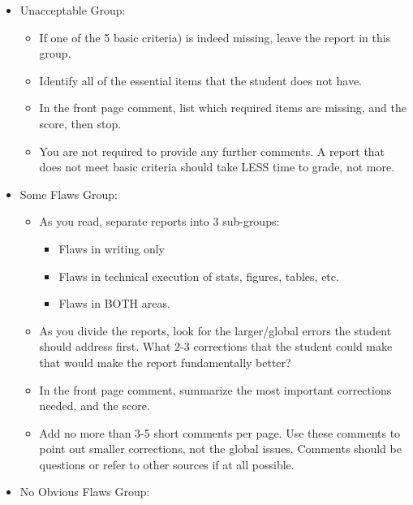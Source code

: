 \documentclass[
]{book}
\providecommand{\tightlist}{%
  \setlength{\itemsep}{0pt}\setlength{\parskip}{0pt}}
\begin{document}
\begin{itemize}
\tightlist
\item
  Unacceptable Group:

  \begin{itemize}
  \tightlist
  \item
    If one of the 5 basic criteria) is indeed missing, leave the report in this group.
  \item
    Identify all of the essential items that the student does not have.
  \item
    In the front page comment, list which required items are missing, and the score, then stop.
  \item
    You are not required to provide any further comments. A report that does not meet basic criteria should take LESS time to grade, not more.
  \end{itemize}
\item
  Some Flaws Group:

  \begin{itemize}
  \tightlist
  \item
    As you read, separate reports into 3 sub-groups:

    \begin{itemize}
    \tightlist
    \item
      Flaws in writing only
    \item
      Flaws in technical execution of stats, figures, tables, etc.
    \item
      Flaws in BOTH areas.
    \end{itemize}
  \item
    As you divide the reports, look for the larger/global errors the student should address first. What 2-3 corrections that the student could make that would make the report fundamentally better?
  \item
    In the front page comment, summarize the most important corrections needed, and the score.
  \item
    Add no more than 3-5 short comments per page. Use these comments to point out smaller corrections, not the global issues. Comments should be questions or refer to other sources if at all possible.
  \end{itemize}
\item
  No Obvious Flaws Group:


\end{itemize}
\end{document}
